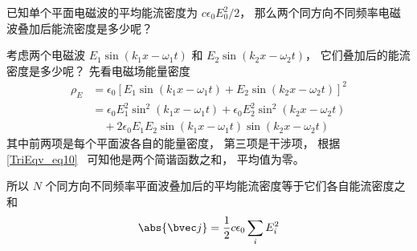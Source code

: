 

已知单个平面电磁波的平均能流密度为 $c\epsilon_0 E_0^2/2$， 那么两个同方向不同频率电磁波叠加后能流密度是多少呢？

考虑两个电磁波 $E_1 \sin(k_1 x - \omega_1 t)$ 和 $E_2 \sin(k_2x - \omega_2 t)$， 它们叠加后的能流密度是多少呢？ 先看电磁场能量密度
\begin{equation}
\begin{aligned}
\rho_E &= \epsilon_0 [E_1 \sin(k_1 x - \omega_1 t) + E_2 \sin(k_2x - \omega_2 t)]^2\\
&= \epsilon_0 E_1^2 \sin^2(k_1 x - \omega_1 t) + \epsilon_0 E_2^2 \sin^2(k_2x - \omega_2 t)\\
&\quad  + 2\epsilon_0 E_1 E_2 \sin(k_1 x - \omega_1 t) \sin(k_2x - \omega_2 t)
\end{aligned}
\end{equation}
其中前两项是每个平面波各自的能量密度， 第三项是干涉项， 根据\autoref{TriEqv_eq10}~ 可知他是两个简谐函数之和， 平均值为零。

所以 $N$ 个同方向不同频率平面波叠加后的平均能流密度等于它们各自能流密度之和
\begin{equation}
\abs{\bvec j} = \frac{1}{2}c\epsilon_0 \sum_i E_i^2
\end{equation}
